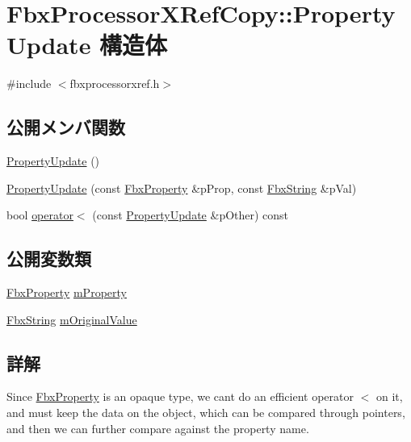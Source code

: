 \hypertarget{struct_fbx_processor_x_ref_copy_1_1_property_update}{}\section{Fbx\+Processor\+X\+Ref\+Copy\+:\+:Property\+Update 構造体}
\label{struct_fbx_processor_x_ref_copy_1_1_property_update}


{\ttfamily \#include $<$fbxprocessorxref.\+h$>$}

\subsection*{公開メンバ関数}
\begin{DoxyCompactItemize}
\item 
\hyperlink{struct_fbx_processor_x_ref_copy_1_1_property_update_a43de8dde5acc6ca87ecd0260b1f268d3}{Property\+Update} ()
\item 
\hyperlink{struct_fbx_processor_x_ref_copy_1_1_property_update_abe945d76debd1b3f05d1d190814553a8}{Property\+Update} (const \hyperlink{class_fbx_property}{Fbx\+Property} \&p\+Prop, const \hyperlink{class_fbx_string}{Fbx\+String} \&p\+Val)
\item 
bool \hyperlink{struct_fbx_processor_x_ref_copy_1_1_property_update_a1fd30e51777d115cc68e217d7581ae64}{operator$<$} (const \hyperlink{struct_fbx_processor_x_ref_copy_1_1_property_update}{Property\+Update} \&p\+Other) const
\end{DoxyCompactItemize}
\subsection*{公開変数類}
\begin{DoxyCompactItemize}
\item 
\hyperlink{class_fbx_property}{Fbx\+Property} \hyperlink{struct_fbx_processor_x_ref_copy_1_1_property_update_a2e5c002f72c067c846ff3bf653273edf}{m\+Property}
\item 
\hyperlink{class_fbx_string}{Fbx\+String} \hyperlink{struct_fbx_processor_x_ref_copy_1_1_property_update_aed07d2bfbf3fa75b4fb33439e3ff62dd}{m\+Original\+Value}
\end{DoxyCompactItemize}


\subsection{詳解}
Since \hyperlink{class_fbx_property}{Fbx\+Property} is an opaque type, we can\textquotesingle{}t do an efficient operator $<$ on it, and must keep the data on the object, which can be compared through pointers, and then we can further compare against the property name. 

